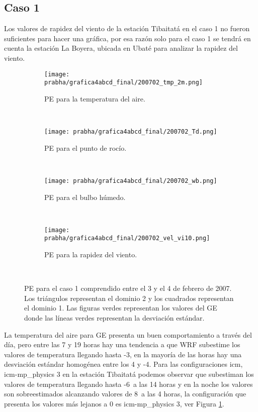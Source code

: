 \subsection{Caso 1}

Los valores de rapidez del viento de la estación Tibaitatá en el caso 1 no fueron suficientes para hacer una gráfica, por esa razón solo para el caso 1 se tendrá en cuenta la estación La Boyera, ubicada en Ubaté para analizar la rapidez del viento.
	
\begin{figure}[H]
    \centering
    \begin{subfigure}[b]{0.45\textwidth}
        \caption{PE para la temperatura del aire.}
	\texttt{[image: prabha/grafica4abcd\_final/200702\_tmp\_2m.png]}
    \label{subfig:tmp_0_caso1}
	\end{subfigure}
	~
	    \begin{subfigure}[b]{0.45\textwidth}
	        \caption{PE para el punto de rocío.}
	\texttt{[image: prabha/grafica4abcd\_final/200702\_Td.png]}

    \label{subfig:td_caso1}
	\end{subfigure}
	~
	    \begin{subfigure}[b]{0.45\textwidth}
	\caption{PE para el bulbo húmedo.}
	\texttt{[image: prabha/grafica4abcd\_final/200702\_wb.png]}
    \label{subfig:wb_caso1}
	\end{subfigure}
	~
	    \begin{subfigure}[b]{0.45\textwidth}
	\caption{PE para la rapidez del viento.}	
	\texttt{[image: prabha/grafica4abcd\_final/200702\_vel\_vi10.png]}
    
    \label{subfig:vel_caso1}
	\end{subfigure}
	~

\caption{PE para el caso 1 comprendido entre el 3 y el 4 de febrero de 2007. Los triángulos representan el dominio 2 y los cuadrados representan el dominio 1. Las figuras verdes representan los valores del GE donde las líneas verdes representan la desviación estándar.}	
\label{subfig:mbe_caso1}	
\end{figure}


La temperatura del aire para GE presenta un buen comportamiento a través del día, pero entre las 7 y 19 horas hay una tendencia a que WRF subestime los valores de temperatura llegando hasta -3\celc, en la mayoría de las horas hay una desviación estándar homogénea entre los 4 y -4. Para las configuraciones icm, icm-mp\_physics 3 en la estación Tibaitatá podemos observar que subestiman los valores de temperatura llegando hasta -6\celc\ a las 14 horas y en la noche los valores son sobreestimados alcanzando valores de 8\celc\ a las 4 horas, la configuración que presenta los valores más lejanos a 0 es icm-mp\_physics 3, ver Figura \ref{subfig:tmp_0_caso1}.\\


